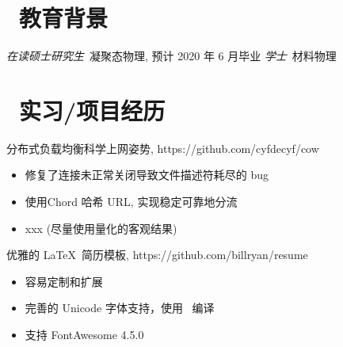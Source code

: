 \documentclass{resume}
\begin{document}


 
\section{\faGraduationCap\  教育背景}
\textit{在读硕士研究生}\ 凝聚态物理, 预计 2020 年 6 月毕业
\textit{学士}\ 材料物理

\section{\faUsers\ 实习/项目经历}

\begin{onehalfspacing}
分布式负载均衡科学上网姿势, https://github.com/cyfdecyf/cow
\begin{itemize}
  \item 修复了连接未正常关闭导致文件描述符耗尽的 bug
  \item 使用Chord 哈希 URL, 实现稳定可靠地分流
  \item xxx (尽量使用量化的客观结果)
\end{itemize}
\end{onehalfspacing}

\begin{onehalfspacing}
优雅的 \LaTeX\ 简历模板, https://github.com/billryan/resume
\begin{itemize}
  \item 容易定制和扩展
  \item 完善的 Unicode 字体支持，使用 \XeLaTeX\ 编译
  \item 支持 FontAwesome 4.5.0
\end{itemize}
\end{onehalfspacing}

\end{document}
